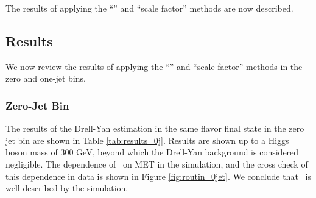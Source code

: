 
The results of applying the ``\routin'' and ``scale factor''  methods are now described.

%
%
%
\subsection{Results}

We now review the results of applying the  ``\routin'' and ``scale factor'' methods in the zero and one-jet bins. 

%
%
%
\subsubsection{Zero-Jet Bin}

The results of the Drell-Yan estimation in the same flavor final state in the zero jet bin
are shown in Table \ref{tab:results_0j}.
Results are shown up to a Higgs boson mass of 300 GeV, beyond which
the Drell-Yan background is considered negligible.
The dependence of \routin~on MET in the simulation, and the cross check of this dependence in data
is shown in Figure \ref{fig:routin_0jet}.
We conclude that \routin~is well described by the simulation.

